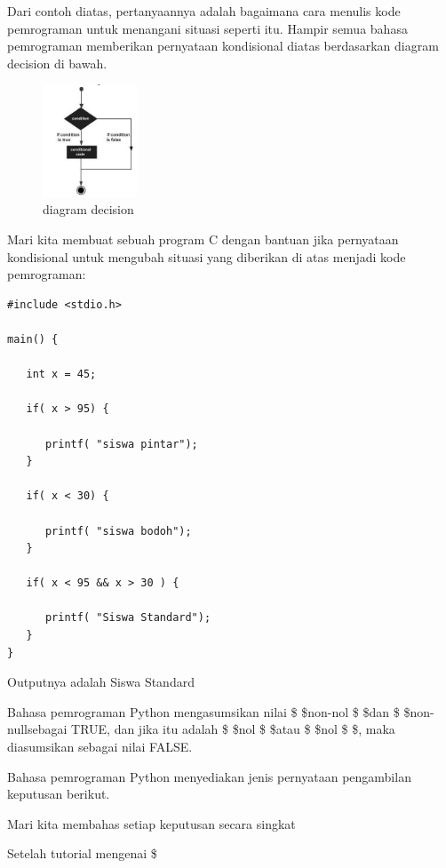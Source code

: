 Dari contoh diatas, pertanyaannya adalah bagaimana cara menulis kode pemrograman untuk menangani situasi seperti itu. Hampir semua bahasa pemrograman memberikan pernyataan kondisional diatas berdasarkan diagram decision di bawah. \par
\begin{figure}[ht]
	    \centerline{\includegraphics[width=0.25\textwidth]{figures/diagram_decision.png}}
	    \caption{diagram decision}
	    \label{diagram_decision}
	    \end{figure} \par

Mari kita membuat sebuah program C dengan bantuan jika pernyataan kondisional untuk mengubah situasi yang diberikan di atas menjadi kode pemrograman: \par 
\begin{verbatim}
#include <stdio.h>
 
main() {
 
   int x = 45;
    
   if( x > 95) {
  
      printf( "siswa pintar");
   }
    
   if( x < 30) {
  
      printf( "siswa bodoh");
   }
    
   if( x < 95 && x > 30 ) {
  
      printf( "Siswa Standard");
   }
}
\end{verbatim}\par
Outputnya adalah Siswa Standard

Bahasa pemrograman Python mengasumsikan nilai \$  \$non-nol \$  \$dan \$  \$non-nullsebagai TRUE, dan jika itu adalah \$  \$nol \$  \$atau \$  \$nol \$  \$, maka diasumsikan sebagai nilai FALSE. \par
Bahasa pemrograman Python menyediakan jenis pernyataan pengambilan keputusan berikut. \par
\vspace{12pt}
\noindent 
Mari kita membahas setiap keputusan secara singkat  \par
\vspace{12pt}
\noindent 
Setelah tutorial mengenai \$ 
